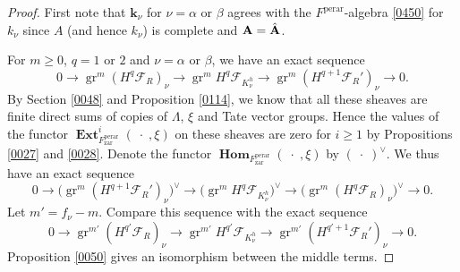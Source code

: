 \documentclass{amsart}
\theoremstyle{remark}
\numberwithin{equation}{subsection}
\newcommand{\zar}{\mathrm{zar}}
\newcommand{\perar}{\mathrm{perar}}
\newcommand{\alg}[1]{\mathbf{#1}}
\newcommand{\var}{\;\cdot\;}
\DeclareMathOperator{\sheafhom}{\alg{Hom}}
\DeclareMathOperator{\sheafext}{\alg{Ext}}
\DeclareMathOperator{\gr}{gr}
\begin{document}
\begin{proof}
	First note that $\alg{k}_{\nu}$ for $\nu = \alpha$ or $\beta$ agrees with
	the $F^{\perar}$-algebra \eqref{0450} for $k_{\nu}$
	since $A$ (and hence $k_{\nu}$) is complete and $\alg{A} = \Hat{\alg{A}}$.
	
	For $m \ge 0$, $q = 1$ or $2$ and $\nu = \alpha$ or $\beta$,
	we have an exact sequence
		\begin{equation} \label{0116}
				0
			\to
				\gr^{m}(H^{q} \mathcal{F}_{R})_{\nu}
			\to
				\gr^{m} H^{q} \mathcal{F}_{K_{\nu}^{h}}
			\to
				\gr^{m}(H^{q + 1} \mathcal{F}_{R}')_{\nu}
			\to
				0.
		\end{equation}
	By Section \ref{0048}
	and Proposition \ref{0114},
	we know that all these sheaves are finite direct sums of copies of
	$\Lambda$, $\xi$ and Tate vector groups.
	Hence the values of the functor
	$\sheafext_{F^{\perar}_{\zar}}^{i}(\var, \xi)$
	on these sheaves are zero for $i \ge 1$
	by Propositions \ref{0027}
	and \ref{0028}.
	Denote the functor $\sheafhom_{F^{\perar}_{\zar}}(\var, \xi)$ by $(\var)^{\vee}$.
	We thus have an exact sequence
		\[
				0
			\to
				\bigl(
					\gr^{m}(H^{q + 1} \mathcal{F}_{R}')_{\nu}
				\bigr)^{\vee}
			\to
				\bigl(
					\gr^{m} H^{q} \mathcal{F}_{K_{\nu}^{h}}
				\bigr)^{\vee}
			\to
				\bigl(
					\gr^{m}(H^{q} \mathcal{F}_{R})_{\nu}
				\bigr)^{\vee}
			\to
				0.
		\]
	Let $m' = f_{\nu} - m$.
	Compare this sequence with the exact sequence
		\begin{equation} \label{0117}
				0
			\to
				\gr^{m'}(H^{q'} \mathcal{F}_{R})_{\nu}
			\to
				\gr^{m'} H^{q'} \mathcal{F}_{K_{\nu}^{h}}
			\to
				\gr^{m'}(H^{q' + 1} \mathcal{F}_{R}')_{\nu}
			\to
				0.
		\end{equation}
	Proposition \ref{0050}
	gives an isomorphism between the middle terms.
	

\end{proof}
\end{document}
